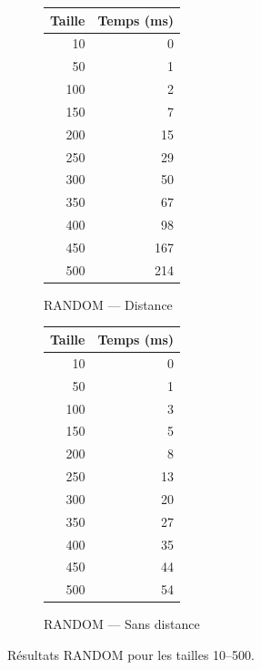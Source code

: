 \documentclass{butexFR}
\begin{document}
\begin{figure}[H]
    \centering

    \begin{subfigure}{0.45\textwidth}
        \centering
        \begin{tabular}{|r|r|}
            \hline
            Taille & Temps (ms) \\
            \hline
            10  & 0 \\
            50  & 1 \\
            100 & 2 \\
            150 & 7 \\
            200 & 15 \\
            250 & 29 \\
            300 & 50 \\
            350 & 67 \\
            400 & 98 \\
            450 & 167 \\
            500 & 214 \\
            \hline
        \end{tabular}
        \caption{RANDOM — Distance}
    \end{subfigure}
    \hfill
    \begin{subfigure}{0.45\textwidth}
        \centering
        \begin{tabular}{|r|r|}
            \hline
            Taille & Temps (ms) \\
            \hline
            10  & 0 \\
            50  & 1 \\
            100 & 3 \\
            150 & 5 \\
            200 & 8 \\
            250 & 13 \\
            300 & 20 \\
            350 & 27 \\
            400 & 35 \\
            450 & 44 \\
            500 & 54 \\
            \hline
        \end{tabular}
        \caption{RANDOM — Sans distance}
    \end{subfigure}

    \caption{Résultats RANDOM pour les tailles 10–500.}
\end{figure}
\end{document}
